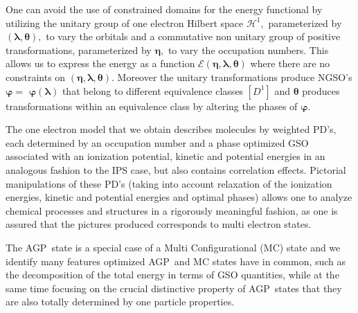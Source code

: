 \documentclass[aps,preprint]{revtex4}%
\begin{document}
One can avoid the use of constrained domains for the energy functional by
utilizing the unitary group of one electron Hilbert space $\mathcal{H}^{1},$
parameterized by $\left(  \bm{\lambda},\bm{\theta}\right)  ,$ to vary the
orbitals and a commutative non unitary group of positive transformations,
parameterized by $\bm{\eta},$ to vary the occupation numbers. This allows us
to express the energy as a function $\mathcal{E}\left(
\bm{\eta },\bm{\lambda},\bm{\theta}\right)  $ where there are no constraints
on $\left(  \bm{\eta},\bm{\lambda},\bm{\theta}\right)  .$ Moreover the unitary
transformations produce NGSO's $\bm{\varphi=}$ $\bm{\varphi}\left(
\bm{\lambda}\right)  $ that belong to different equivalence classes $\left[
D^{1}\right]  $ and $\bm{\theta}$ produces transformations within an
equivalence class by altering the phases of $\bm{\varphi.}$

The one electron model that we obtain describes molecules by weighted PD's,
each determined by an occupation number and a phase optimized GSO associated
with an ionization potential, kinetic and potential energies in an analogous
fashion to the IPS case, but also contains correlation effects. Pictorial
manipulations of these PD's (taking into account relaxation of the ionization
energies, kinetic and potential energies and optimal phases) allows one to
analyze chemical processes and structures in a rigorously meaningful fashion,
as one is assured that the pictures produced corresponds to multi electron states.

The AGP\ state is a special case of a Multi Configurational (MC) state and we
identify many features optimized AGP\ and MC states have in common, such as
the decomposition of the total energy in terms of GSO quantities, while at the
same time focusing on the crucial distinctive property of AGP\ states that
they are also totally determined by one particle properties.
\end{document}
